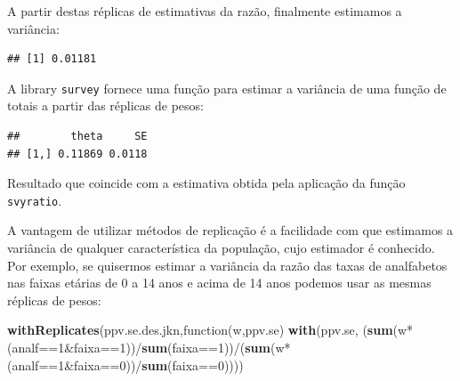 \documentclass[]{book}
\newenvironment{Shaded}{\begin{snugshade}}{\end{snugshade}}
\newcommand{\KeywordTok}[1]{\textcolor[rgb]{0.13,0.29,0.53}{\textbf{{#1}}}}
\newcommand{\DecValTok}[1]{\textcolor[rgb]{0.00,0.00,0.81}{{#1}}}
\newcommand{\StringTok}[1]{\textcolor[rgb]{0.31,0.60,0.02}{{#1}}}
\newcommand{\NormalTok}[1]{{#1}}
\numberwithin{example}{chapter}
\numberwithin{remark}{chapter}
\numberwithin{definition}{chapter}
\begin{document}
A partir destas réplicas de estimativas da razão, finalmente estimamos a
variância:

\begin{Shaded}
\end{Shaded}

\begin{verbatim}
## [1] 0.01181
\end{verbatim}

A library \texttt{survey} \citep{R-survey} fornece uma função para
estimar a variância de uma função de totais a partir das réplicas de
pesos:

\begin{Shaded}
\end{Shaded}

\begin{verbatim}
##        theta     SE
## [1,] 0.11869 0.0118
\end{verbatim}

Resultado que coincide com a estimativa obtida pela aplicação da função
\texttt{svyratio}.

A vantagem de utilizar métodos de replicação é a facilidade com que
estimamos a variância de qualquer característica da população, cujo
estimador é conhecido. Por exemplo, se quisermos estimar a variância da
razão das taxas de analfabetos nas faixas etárias de 0 a 14 anos e acima
de 14 anos podemos usar as mesmas réplicas de pesos:

\begin{Shaded}
\begin{Highlighting}[]
\KeywordTok{withReplicates}\NormalTok{(ppv.se.des.jkn,function(w,ppv.se) }\KeywordTok{with}\NormalTok{(ppv.se,}
\NormalTok{(}\KeywordTok{sum}\NormalTok{(w*(analf==}\DecValTok{1}\NormalTok{&faixa==}\DecValTok{1}\NormalTok{))/}\KeywordTok{sum}\NormalTok{(faixa==}\DecValTok{1}\NormalTok{))/(}\KeywordTok{sum}\NormalTok{(w*(analf==}\DecValTok{1}\NormalTok{&faixa==}\DecValTok{0}\NormalTok{))/}\KeywordTok{sum}\NormalTok{(faixa==}\DecValTok{0}\NormalTok{))))}
\end{Highlighting}
\end{Shaded}
\end{document}
